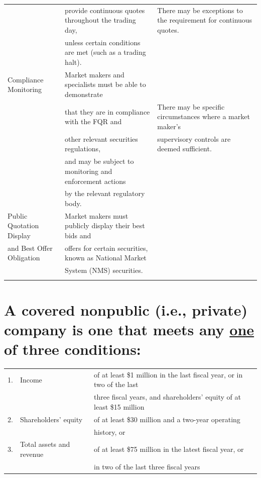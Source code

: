 \documentclass[11pt]{article}
\begin{document}
\begin{center}
\begin{tabular}{lll}
 & provide continuous quotes throughout the trading day, & There may be exceptions to the requirement for continuous quotes.\\[0pt]
 & unless certain conditions are met (such as a trading halt). & \\[0pt]
\hline
Compliance Monitoring & Market makers and specialists must be able to demonstrate & \\[0pt]
 & that they are in compliance with the FQR and & There may be specific circumstances where a market maker's\\[0pt]
 & other relevant securities regulations, & supervisory controls are deemed sufficient.\\[0pt]
 & and may be subject to monitoring and enforcement actions & \\[0pt]
 & by the relevant regulatory body. & \\[0pt]
\hline
Public Quotation Display & Market makers must publicly display their best bids and & \\[0pt]
and Best Offer Obligation & offers for certain securities, known as National Market & \\[0pt]
 & System (NMS) securities. & \\[0pt]
 &  & \\[0pt]
\hline
\end{tabular}
\end{center}


\section{A covered nonpublic (i.e., private) company is one that meets any \underline{one} of three conditions:}
\label{sec:org63ad247}

\begin{center}
\begin{tabular}{rll}
\hline
1. & Income & of at least \$1 million in the last fiscal year, or in two of the last\\[0pt]
 &  & three fiscal years, and shareholders’ equity of at least \$15 million\\[0pt]
2. & Shareholders’ equity & of at least \$30 million and a two-year operating\\[0pt]
 &  & history, or\\[0pt]
3. & Total assets and revenue & of at least \$75 million in the latest fiscal year, or\\[0pt]
 &  & in two of the last three fiscal years\\[0pt]
\hline
\end{tabular}
\end{center}
\end{document}
